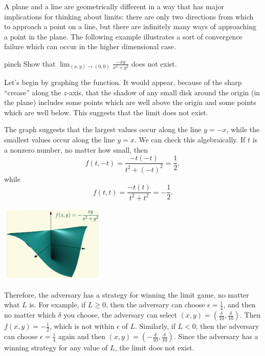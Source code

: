 \documentclass[svgnames]{report}
\begin{document}
A plane and a line are geometrically different in a way that has major
implications for thinking about limits: there are only two directions
from which to approach a point on a line, but there are infinitely
many ways of approaching a point in the plane. The following example
illustrates a sort of convergence failure which can occur in the
higher dimensional case.

\begin{example}{}{pinch}
    Show that $\displaystyle{\lim_{(x,y) \to
        (0,0)}\frac{-xy}{x^2+y^2}}$ does not exist.
\end{example}

\begin{solution}
  \begin{minipage}{0.7\textwidth}
    Let's begin by graphing the function.  It would appear,
    because of the sharp ``crease'' along the $z$-axis, that the shadow
    of any small disk around the origin (in the plane) includes some
    points which are well above the origin and some points which are
    well below. This suggests that the limit does not exist.

    The graph suggests that the largest values occur along the line
    $y=-x$, while the smallest values occur along the line $y = x$. We
    can check this algebraically. If $t$ is a nonzero number, no
    matter how small, then
    \[
      f(t,-t) = \frac{-t(-t)}{t^2 + (-t)^2} = \frac{1}{2}, 
    \]
    while
    \[
      f(t,t) = \frac{-t(t)}{t^2 + t^2} = -\frac{1}{2}. 
    \]
  \end{minipage}
  \begin{minipage}{0.29\textwidth}
    \includegraphics[width=5cm]{figures/limit}
  \end{minipage}
  
  Therefore, the adversary has a strategy for winning the limit game,
  no matter what $L$ is. For example, if $L \geq 0$, then the
  adversary can choose $\epsilon = \tfrac{1}{4}$, and then no matter
  which $\delta$ you choose, the adversary can select
  $(x,y) = (\frac{\delta}{10}, \frac{\delta}{10})$. Then
  $f(x,y) = -\tfrac{1}{2}$, which is not within $\epsilon$ of
  $L$. Similarly, if $L < 0$, then the adversary can choose $\epsilon
  = \tfrac{1}{4}$ again and then $(x,y) = (-\frac{\delta}{10},
  \frac{\delta}{10})$. Since the adversary has a winning strategy for any value of
  $L$, the limit does not exist.
\end{solution}
\end{document}
